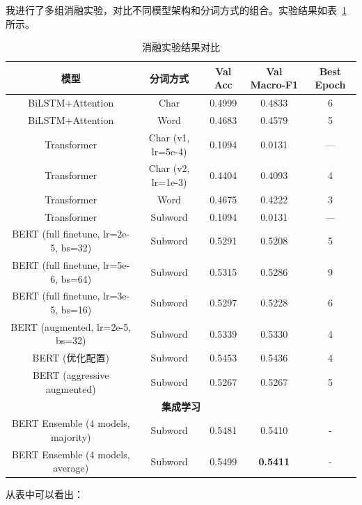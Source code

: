 \documentclass[a4paper]{article}
\begin{document}
我进行了多组消融实验，对比不同模型架构和分词方式的组合。实验结果如表~\ref{tab:ablation} 所示。

\begin{table}[H]
    \centering
    \small
    \begin{tabular}{|c|c|c|c|c|}
        \hline
        \textbf{模型} & \textbf{分词方式} & \textbf{Val Acc} & \textbf{Val Macro-F1} & \textbf{Best Epoch} \\
        \hline
        BiLSTM+Attention & Char & 0.4999 & 0.4833 & 6 \\
        BiLSTM+Attention & Word & 0.4683 & 0.4579 & 5 \\
        Transformer & Char (v1, lr=5e-4) & 0.1094 & 0.0131 & --- \\
        Transformer & Char (v2, lr=1e-3) & 0.4404 & 0.4093 & 4 \\
        Transformer & Word & 0.4675 & 0.4222 & 3 \\
        Transformer & Subword & 0.1094 & 0.0131 & --- \\
        BERT (full finetune, lr=2e-5, bs=32) & Subword & 0.5291 & 0.5208 & 5 \\
        BERT (full finetune, lr=5e-6, bs=64) & Subword & 0.5315 & 0.5286 & 9 \\
        BERT (full finetune, lr=3e-5, bs=16) & Subword & 0.5297 & 0.5228 & 6 \\
        BERT (augmented, lr=2e-5, bs=32) & Subword & 0.5339 & 0.5330 & 4 \\
        BERT (优化配置) & Subword & 0.5453 & 0.5436 & 4 \\
        BERT (aggressive augmented) & Subword & 0.5267 & 0.5267 & 5 \\
        \hline
        \multicolumn{5}{|c|}{\textbf{集成学习}} \\
        \hline
        BERT Ensemble (4 models, majority) & Subword & 0.5481 & 0.5410 & - \\
        BERT Ensemble (4 models, average) & Subword & 0.5499 & \textbf{0.5411} & - \\
        \hline
    \end{tabular}
    \caption{消融实验结果对比}
    \label{tab:ablation}
\end{table}

从表中可以看出：
\end{document}

